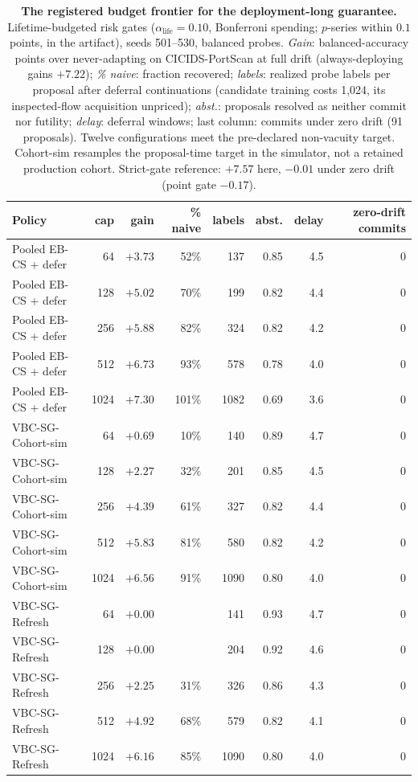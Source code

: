 \begin{table}[t]
\centering
\caption{\textbf{The registered budget frontier for the deployment-long guarantee.}
Lifetime-budgeted risk gates ($\alpha_{\mathrm{life}}{=}0.10$, Bonferroni spending;
$p$-series within $0.1$ points, in the artifact), seeds 501--530, balanced probes.
\emph{Gain}: balanced-accuracy points over never-adapting on CICIDS-PortScan at full
drift (always-deploying gains $+7.22$); \emph{\% naive}: fraction recovered;
\emph{labels}: realized probe labels per proposal after deferral continuations (candidate
training costs 1{,}024, its inspected-flow acquisition unpriced); \emph{abst.}:
proposals resolved as neither commit nor futility; \emph{delay}: deferral windows; last
column: commits under zero drift (91 proposals). Twelve configurations meet the pre-declared
non-vacuity target. Cohort-sim resamples the proposal-time target in the simulator, not a
retained production cohort. Strict-gate reference: $+7.57$ here,
$-0.01$ under zero drift (point gate $-0.17$).}
\label{tab:budget_frontier}
\small
\begin{tabular}{l r r r r r r r}
\toprule
Policy & cap & gain & \% naive & labels & abst. & delay & zero-drift commits \\
\midrule
Pooled EB-CS + defer & 64 & $+3.73$ & 52\% & 137 & 0.85 & 4.5 & 0 \\
Pooled EB-CS + defer & 128 & $+5.02$ & 70\% & 199 & 0.82 & 4.4 & 0 \\
Pooled EB-CS + defer & 256 & $+5.88$ & 82\% & 324 & 0.82 & 4.2 & 0 \\
Pooled EB-CS + defer & 512 & $+6.73$ & 93\% & 578 & 0.78 & 4.0 & 0 \\
Pooled EB-CS + defer & 1024 & $+7.30$ & 101\% & 1082 & 0.69 & 3.6 & 0 \\
\addlinespace
VBC-SG-Cohort-sim & 64 & $+0.69$ & 10\% & 140 & 0.89 & 4.7 & 0 \\
VBC-SG-Cohort-sim & 128 & $+2.27$ & 32\% & 201 & 0.85 & 4.5 & 0 \\
VBC-SG-Cohort-sim & 256 & $+4.39$ & 61\% & 327 & 0.82 & 4.4 & 0 \\
VBC-SG-Cohort-sim & 512 & $+5.83$ & 81\% & 580 & 0.82 & 4.2 & 0 \\
VBC-SG-Cohort-sim & 1024 & $+6.56$ & 91\% & 1090 & 0.80 & 4.0 & 0 \\
\addlinespace
VBC-SG-Refresh & 64 & $+0.00$ &  & 141 & 0.93 & 4.7 & 0 \\
VBC-SG-Refresh & 128 & $+0.00$ &  & 204 & 0.92 & 4.6 & 0 \\
VBC-SG-Refresh & 256 & $+2.25$ & 31\% & 326 & 0.86 & 4.3 & 0 \\
VBC-SG-Refresh & 512 & $+4.92$ & 68\% & 579 & 0.82 & 4.1 & 0 \\
VBC-SG-Refresh & 1024 & $+6.16$ & 85\% & 1090 & 0.80 & 4.0 & 0 \\
\bottomrule
\end{tabular}
\end{table}
